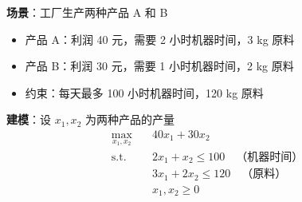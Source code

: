\documentclass[12pt, a4paper]{ctexart}
\begin{document}
\begin{blackboard}[LP 例子 1：生产计划]

\textbf{场景}：工厂生产两种产品 A 和 B

\begin{itemize}
    \item 产品 A：利润 40 元，需要 2 小时机器时间，3 kg 原料
    \item 产品 B：利润 30 元，需要 1 小时机器时间，2 kg 原料
    \item 约束：每天最多 100 小时机器时间，120 kg 原料
\end{itemize}

\textbf{建模}：设 $x_1, x_2$ 为两种产品的产量
\[
\begin{aligned}
\max_{x_1, x_2} \quad & 40 x_1 + 30 x_2 \\
\text{s.t.} \quad & 2x_1 + x_2 \leq 100 \quad \text{（机器时间）} \\
& 3x_1 + 2x_2 \leq 120 \quad \text{（原料）} \\
& x_1, x_2 \geq 0
\end{aligned}
\]

\end{blackboard}
\end{document}
